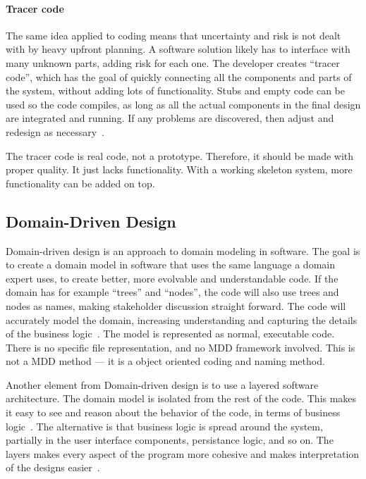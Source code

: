 \paragraph{Tracer code}
The same idea applied to coding means that uncertainty and risk is not dealt with by heavy upfront planning.
A software solution likely has to interface with many unknown parts, adding risk for each one.
The developer creates ``tracer code'', which has the goal of quickly connecting all the components and parts of the system, without adding lots of functionality.
Stubs and empty code can be used so the code compiles, as long as all the actual components in the final design are integrated and running.
If any problems are discovered, then adjust and redesign as necessary~\cite{huntPragmaticProgrammerJourneyman2000}. 


The tracer code is real code, not a prototype.
Therefore, it should be made with proper quality.
It just lacks functionality.
With a working skeleton system, more functionality can be added on top.


\subsection{Domain-Driven Design}

Domain-driven design is an approach to domain modeling in software.
The goal is to create a domain model in software that uses the same language a domain expert uses, to create better, more evolvable and understandable code.
If the domain has for example ``trees'' and ``nodes'', the code will also use trees and nodes as names, making stakeholder discussion straight forward.
The code will accurately model the domain, increasing understanding and capturing the details of the business logic~\cite{evansDomaindrivenDesignTackling2004}.
The model is represented as normal, executable code.
There is no specific file representation, and no \acrshort{MDD} framework involved.
This is not a \acrshort{MDD} method --- it is a object oriented coding and naming method.


Another element from Domain-driven design is to use a layered software architecture.
The domain model is isolated from the rest of the code.
This makes it easy to see and reason about the behavior of the code, in terms of business logic~\cite[p.~69]{evansDomaindrivenDesignTackling2004}.
The alternative is that business logic is spread around the system, partially in the user interface components, persistance logic, and so on.
The layers makes every aspect of the program more cohesive and makes interpretation of the designs easier~\cite[p.~69]{evansDomaindrivenDesignTackling2004}.


